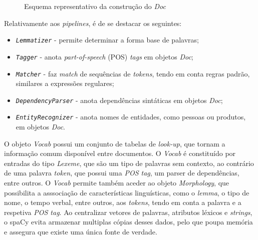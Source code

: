 \documentclass[12pt]{article}
\begin{document}
\begin{figure}[!ht]
	\centering
	\setlength{\abovecaptionskip}{-.8cm}
	\caption{Esquema representativo da construção do \textit{Doc}}
	\label{figure:pipelines}
\end{figure}

Relativamente aos \textit{pipelines}, é de se destacar os seguintes:
\vspace*{-0.3cm}
\begin{itemize}\itemsep1pt
	\setlength{\itemindent}{+.5cm}	
	\item \texttt{\textit{Lemmatizer}} - permite determinar a forma base de palavras;
	\item \texttt{\textit{Tagger}} - anota \textit{part-of-speech} (POS) \textit{tags} em objetos \textit{Doc};
	\item \texttt{\textit{Matcher}} - faz \textit{match} de sequências de \textit{tokens}, tendo em conta regras padrão, similares a expressões regulares;
	\item \texttt{\textit{DependencyParser}} - anota dependências sintáticas em objetos \textit{Doc};
	\item \texttt{\textit{EntityRecognizer}} - anota nomes de entidades, como pessoas ou produtos, em objetos \textit{Doc}.
\end{itemize}

O objeto \textit{Vocab} possui um conjunto de tabelas de \textit{look-up}, que tornam a informação comum disponível entre documentos. O \textit{Vocab} é constituído por entradas do tipo \textit{Lexeme}, que são um tipo de palavras sem contexto, ao contrário de uma palavra \textit{token}, que possui uma \textit{POS tag}, um parser de dependências, entre outros. O \textit{Vocab} permite também aceder ao objeto \textit{Morphology}, que possibilita a asssociação de características linguísticas, como o \textit{lemma}, o tipo de nome, o tempo verbal, entre outros, aos \textit{tokens}, tendo em conta a palavra e a respetiva \textit{POS tag}. Ao centralizar vetores de palavras, atributos léxicos e \textit{strings}, o spaCy evita armazenar multiplas cópias desses dados, pelo que poupa memória e assegura que existe uma única fonte de verdade. 
\end{document}
